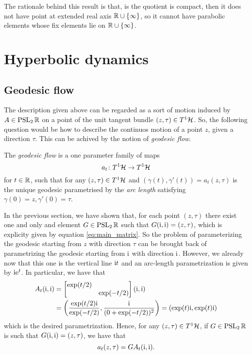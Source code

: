 The rationale behind this result is that, is the quotient is compact, then it does not have point at extended real axis $\mathbb{R}\cup\{\infty\}$, so it cannot have parabolic elements whose fix elements lie on $\mathbb{R}\cup\{\infty\}$.








\section{Hyperbolic dynamics}


\label{sec:hyp_dynam}

\subsection{Geodesic flow}

The description given above can be regarded as a sort of  motion induced by $A\in\operatorname{PSL}_{2}\mathbb{R}$ on a point of the unit tangent bundle $(z,\tau)\in T^{1}\mathcal{H}$. So, the following question would be how to describe the continuos motion of a point $z$, given a direction $\tau$. This can be achived by the notion of \emph{geodesic flow}.

\begin{defin}
\label{def:geod_flow}
The \emph{geodesic flow} is a one parameter family of maps 
\[
a_{t}\colon T^{1}\mathcal{H}\to T^{1}\mathcal{H}
\]
for $t\in\mathbb{R}$, such that for any $(z,\tau)\in T^{1}\mathcal{H}$ and $(\gamma(t),\gamma'(t))=a_{t}(z,\tau)$ is the unique geodesic parametrised by the \emph{arc length} satisfying $\gamma(0)=z,\gamma'(0)=\tau$.
\end{defin}

In the previous section, we have shown that, for each point $(z,\tau)$ there exist one and only and element $G\in\operatorname{PSL}_{2}\mathbb{R}$ such that $G(\mathrm{i},\mathrm{i})=(z,\tau)$, which is explicity given by equation \eqref{eq:main_matrix}. So the problem of parameterizing the geodesic starting from $z$ with direction $\tau$ can be brought back of parametrizing the geodesic starting from $\mathrm{i}$ with direction $\mathrm{i}$. However, we already now that this one is the vertical line $\mathrm{i} t$ and an arc-length parametrization is given by $\mathrm{i}\mathrm{e}^{t}$. In particular, we have that 
\begin{align*}
A_{t}(\mathrm{i},\mathrm{i})&=\begin{bmatrix} \exp(t/2)&\\&\exp(-t/2) \end{bmatrix}(\mathrm{i},\mathrm{i})\\
&=\left(\frac{\exp(t/2)\mathrm{i}}{\exp(-t/2)},\frac{\mathrm{i}}{(0+\exp(-t/2))^{2}}\right)=(\exp(t)\mathrm{i},\exp(t)\mathrm{i})
\end{align*}
which is the desired parametrization. Hence, for any $(z,\tau)\in T^{1}\mathcal{H}$, if $G\in\operatorname{PSL}_{2}\mathbb{R}$ is such that $G(\mathrm{i},\mathrm{i})=(z,\tau)$, we have that
\[
a_{t}(z,\tau)=GA_{t}(\mathrm{i},\mathrm{i}).
\]

